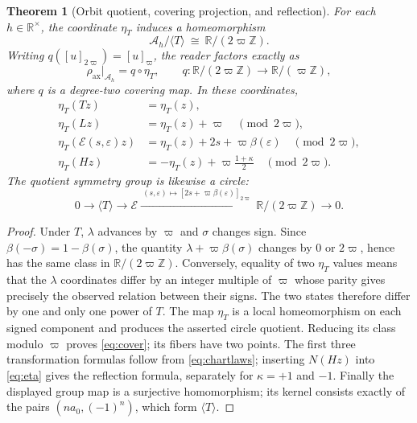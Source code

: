 \documentclass[10pt,letterpaper]{article}
\newtheorem{theorem}{Theorem}[section]
\theoremstyle{definition}\newtheorem{definition}[theorem]{Definition}
\newcommand{\RR}{\mathbb R}
\newcommand{\ZZ}{\mathbb Z}
\newcommand{\eps}{\varepsilon}
\newcommand{\aE}{\mathcal E}
\newcommand{\Ah}{\mathcal A_h}
\newcommand{\varp}{\varpi}
\newcommand{\rhoax}{\rho_{\mathrm{ax}}}
\newcommand{\etaT}{\eta_T}
\begin{document}
\begin{theorem}[Orbit quotient, covering projection, and reflection]\label{thm:cover}
For each $h\in\RR^\times$, the coordinate $\etaT$ induces a homeomorphism
\begin{equation}\label{eq:quotient}
 \Ah/\langle T\rangle\ \cong\ \RR/(2\varp\ZZ).
\end{equation}
Writing $q([u]_{2\varp})=[u]_{\varp}$, the reader factors exactly as
\begin{equation}\label{eq:cover}
 \rhoax\big|_{\Ah}=q\circ\etaT,\qquad
 q:\RR/(2\varp\ZZ)\longrightarrow\RR/(\varp\ZZ),
\end{equation}
where $q$ is a degree-two covering map. In these coordinates,
\begin{align}\label{eq:coveraction}
 \etaT(Tz)&=\etaT(z),\\
 \etaT(Lz)&=\etaT(z)+\varp\quad\pmod{2\varp},\\
 \etaT(\mathcal E(s,\eps)z)&=\etaT(z)+2s+\varp\beta(\eps)\quad\pmod{2\varp},\\
 \etaT(Hz)&=-\etaT(z)+\varp\frac{1+\kappa}{2}\quad\pmod{2\varp}.
\end{align}
The quotient symmetry group is likewise a circle:
\begin{equation}\label{eq:exactseq}
 0\longrightarrow\langle T\rangle\longrightarrow\aE
 \xrightarrow{\ (s,\eps)\mapsto[2s+\varp\beta(\eps)]_{2\varp}\ }
 \RR/(2\varp\ZZ)\longrightarrow0.
\end{equation}
\end{theorem}
\begin{proof}
Under $T$, $\lambda$ advances by $\varp$ and $\sigma$ changes sign. Since $\beta(-\sigma)=1-\beta(\sigma)$, the quantity $\lambda+\varp\beta(\sigma)$ changes by $0$ or $2\varp$, hence has the same class in $\RR/(2\varp\ZZ)$. Conversely, equality of two $\etaT$ values means that the $\lambda$ coordinates differ by an integer multiple of $\varp$ whose parity gives precisely the observed relation between their signs. The two states therefore differ by one and only one power of $T$. The map $\etaT$ is a local homeomorphism on each signed component and produces the asserted circle quotient. Reducing its class modulo $\varp$ proves \eqref{eq:cover}; its fibers have two points. The first three transformation formulas follow from \eqref{eq:chartlaws}; inserting $N(Hz)$ into \eqref{eq:eta} gives the reflection formula, separately for $\kappa=+1$ and $-1$. Finally the displayed group map is a surjective homomorphism; its kernel consists exactly of the pairs $(na_0,(-1)^n)$, which form $\langle T\rangle$.
\end{proof}
\end{document}
